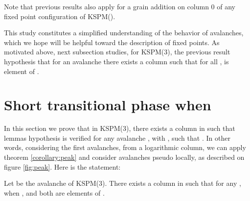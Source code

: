 \documentclass[11pt,a4paper]{llncs}
\begin{document}
Note that previous results also apply for a grain addition on column 0 of any fixed point configuration of KSPM().

This study constitutes a simplified understanding of the behavior of avalanches, which we hope will be helpful toward the description of fixed points. As motivated above, next subsection studies, for KSPM(3),  the previous result hypothesis  that for an avalanche  there exists a column  such that for all ,  is element of .\\
    
\section{Short transitional phase when }\label{section:bounding}

In this section we prove that in KSPM(3), there exists a column  in  such that lemmas hypothesis is verified for any avalanche , with , such that . In other words, considering the  first avalanches, from a logarithmic column,  we can apply theorem \ref{corollary:peak} and consider avalanches pseudo locally, as described on figure \ref{fig:peak}. Here is the statement:

\begin{proposition}\label{lemma:meta2}
Let  be the  avalanche of KSPM(3). There exists a column  in  such that for any , when  ,  and  both are elements of .
\end{proposition}
\end{document}
